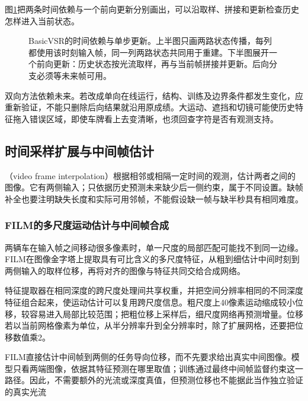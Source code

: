 图\ref{fig:vision-basicvsr-propagation}把两条时间依赖与一个前向更新分别画出，可以沿取样、拼接和更新检查历史怎样进入当前状态。
\begin{figure}[htbp]
  \centering
  
  \caption{BasicVSR的时间依赖与单步更新。上半图只画两路状态传播，每列都使用该时刻输入帧，同一列两路状态共同用于重建。下半图展开一个前向更新：历史状态按光流取样，再与当前帧拼接并更新。后向分支必须等未来帧可用。}
  \label{fig:vision-basicvsr-propagation}
\end{figure}
\FloatBarrier

双向方法依赖未来。若改成单向在线运行，结构、训练及边界条件都发生变化，应重新验证，不能只删除后向结果就沿用原成绩。大运动、遮挡和切镜可能使历史特征拖入错误区域，即使车牌看上去变清晰，也须回查字符是否有观测支持。

\subsection{时间采样扩展与中间帧估计}
\label{sec:vision-video-interpolation}

（video frame interpolation）根据相邻或相隔一定时间的观测，估计两者之间的图像。它有两侧输入；只依据历史预测未来缺少后一侧约束，属于不同设置。缺帧补全也要注明缺失长度和实际可用邻帧，不能假设缺一帧与缺半秒具有相同难度。

\subsubsection{FILM的多尺度运动估计与中间帧合成}
\label{sec:vision-video-film}

两辆车在输入帧之间移动很多像素时，单一尺度的局部匹配可能找不到同一边缘。FILM在图像金字塔上提取具有可比含义的多尺度特征，从粗到细估计中间时刻到两侧输入的取样位移，再将对齐的图像与特征共同交给合成网络。

特征提取器在相同深度的跨尺度处理间共享权重，并把空间分辨率相同的不同深度特征组合起来，使运动估计可以复用跨尺度信息。粗尺度上40像素运动缩成较小位移，较容易进入局部比较范围；把粗位移上采样后，细尺度网络再预测增量。位移若以当前网格像素为单位，从半分辨率升到全分辨率时，除了扩展网格，还要把位移数值乘2。

FILM直接估计中间帧到两侧的任务导向位移，而不先要求给出真实中间图像。模型只看两端图像，依据其特征预测在哪里取值；训练通过最终中间帧监督约束这一路径。因此，不需要额外的光流或深度真值，但预测位移也不能据此当作独立验证的真实光流

